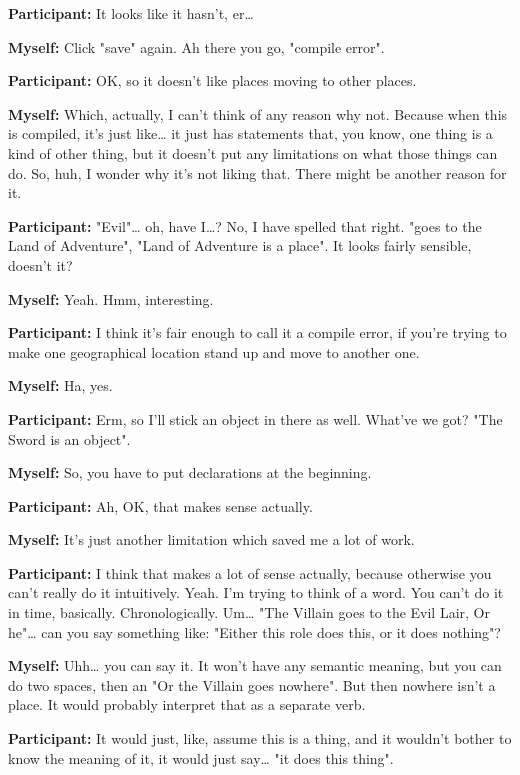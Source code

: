 \documentclass[11pt]{report}
\newcommand{\llabel}[1]{\hypertarget{llineno:#1}{\linelabel{#1}}}
\begin{document}
\begin{linenumbers}
\textbf{Participant:} It looks like it hasn't, er\ldots{}

\textbf{Myself:} Click "save" again. Ah there you go, "compile error".

\textbf{Participant:} OK, so it doesn't like places moving to other places.

\textbf{Myself:} Which, actually, I can't think of any reason why not. Because when this is compiled, it's just like\ldots{} it just has statements that, you know, one thing is a kind of other thing, but it doesn't put any limitations on what those things can do. So, huh, I wonder why it's not liking that. There might be another reason for it.

\textbf{Participant:} "Evil"\ldots{} oh, have I\ldots{}? No, I have spelled that right. "goes to the Land of Adventure", "Land of Adventure is a place". It looks fairly sensible, doesn't it?

\textbf{Myself:} Yeah. Hmm, interesting.

\textbf{Participant:} I think it's fair enough to call it a compile error, if you're trying to make one geographical location stand up and move to another one.

\textbf{Myself:} Ha, yes.

\textbf{Participant:} Erm, so I'll stick an object in there as well. What've we got? "The Sword is an object".

\textbf{Myself:} So, you have to put declarations at the
beginning.\llabel{lne:syntax4d}

\textbf{Participant:} Ah, OK, that makes sense actually.

\textbf{Myself:} It's just another limitation which saved me a lot of work.

\textbf{Participant:} I think that makes a lot of sense actually, because otherwise you can't really do it intuitively. Yeah. I'm trying to think of a word. You can't do it in time, basically. Chronologically. Um\ldots{} "The Villain goes to the Evil Lair, Or he"\ldots{} can you say something like: "Either this role does this, or it does nothing"?

\textbf{Myself:} Uhh\ldots{} you can say it. It won't have any semantic meaning, but you can do two spaces, then an "Or the Villain goes nowhere". But then nowhere isn't a place. It would probably interpret that as a separate verb.\llabel{lne:feature4d}

\textbf{Participant:} It would just, like, assume this is a thing, and it wouldn't bother to know the meaning of it, it would just say\ldots{} "it does this thing".


\end{linenumbers}
\end{document}
